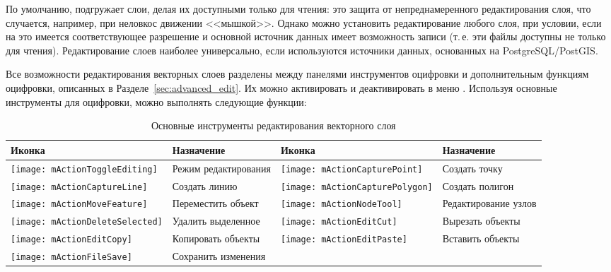 По умолчанию, \qg подгружает слои, делая их доступными только для чтения:
это защита от непреднамеренного редактирования слоя, что случается, например,
при неловкос движении <<мышкой>>. Однако можно установить редактирование
любого слоя, при условии, если на это имеется соответствующее разрешение
и основной источник данных имеет возможность записи (т.\,е. эти файлы
доступны не только для чтения). Редактирование слоев наиболее универсально,
если используются источники данных, основанных на PostgreSQL/PostGIS.

Все возможности редактирования векторных слоев разделены между панелями
инструментов оцифровки и дополнительным функциям оцифровки, описанных в
Разделе~\ref{sec:advanced_edit}. Их можно активировать и деактивировать
в меню  \arrow {}.
Используя основные инструменты для оцифровки, можно выполнять следующие
функции:

\begin{table}[ht]
\centering
\begin{tabular}{|l|p{5.5cm}|l|p{5.5cm}|}
\hline \textbf{Иконка} & \textbf{Назначение} & \textbf{Иконка} & \textbf{Назначение} \\
\hline \texttt{[image: mActionToggleEditing]}
   & Режим редактирования
   & \texttt{[image: mActionCapturePoint]}
   & Создать точку \\
\hline \texttt{[image: mActionCaptureLine]}
   & Создать линию
   & \texttt{[image: mActionCapturePolygon]}
   & Создать полигон \\
\hline \texttt{[image: mActionMoveFeature]}
   & Переместить объект
   & \texttt{[image: mActionNodeTool]}
   & Редактирование узлов \\
\hline \texttt{[image: mActionDeleteSelected]}
   & Удалить выделенное
   & \texttt{[image: mActionEditCut]}
   & Вырезать объекты \\
\hline \texttt{[image: mActionEditCopy]}
   & Копировать объекты
   & \texttt{[image: mActionEditPaste]}
   & Вставить объекты \\
\hline \texttt{[image: mActionFileSave]}
   & Сохранить изменения
   &  &  \\
\hline
\end{tabular}
\caption{Основные инструменты редактирования векторного слоя}\label{tab:vector_editing}\medskip
\end{table}

